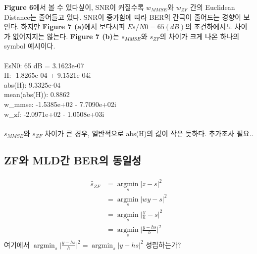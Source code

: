 \documentclass{article}
\newcommand{\bd}{\textbf} %
\providecommand{\abs}[1]{\lvert#1\rvert}
\begin{document}
\bd{Figure 6}에서 볼 수 있다싶이, SNR이 커질수록 $w_{MMSE}$와 $w_{ZF}$ 간의 Euclidean Distance는 줄어들고 있다. SNR이 증가함에 따라 BER의 간극이 줄어드는 경향이 보인다. 하지만 \bd{Figure 7 (a)}에서 보다시피 $Es/N0=65(dB)$의 조건하에서도 차이가 없어지지는 않는다. \bd{Figure 7 (b)}는 $s_{MMSE}$와 $s_{ZF}$의 차이가 크게 나온 하나의 symbol 예시이다.\\
\\
EsN0: 65 dB = 3.1623e-07\\
H: -1.8265e-04 + 9.1521e-04i\\
abs(H): 9.3325e-04\\
mean(abs(H)): 0.8862\\
w\_mmse: -1.5385e+02 - 7.7090e+02i\\
w\_zf:  -2.0971e+02 - 1.0508e+03i\\
\\
$s_{MMSE}$와 $s_{ZF}$ 차이가 큰 경우, 일반적으로 abs(H)의 값이 작은 듯하다.
추가조사 필요..
\subsection{ZF와 MLD간 BER의 동일성}
\begin{gather}
	\begin{split}
	\hat{s}_{ZF}&=\operatorname*{argmin}_s \abs{z-s}^2\\
	&=\operatorname*{argmin}_s \abs{wy-s}^2\\
	&=\operatorname*{argmin}_s \abs{\frac{y}{h}-s}^2\\
	&=\operatorname*{argmin}_s \abs{\frac{y-hs}{h}}^2
	\end{split}
\end{gather}
여기에서 $\operatorname*{argmin}_s \abs{\frac{y-hs}{h}}^2 = \operatorname*{argmin}_s \abs{y-hs}^2$  성립하는가?
\end{document}
